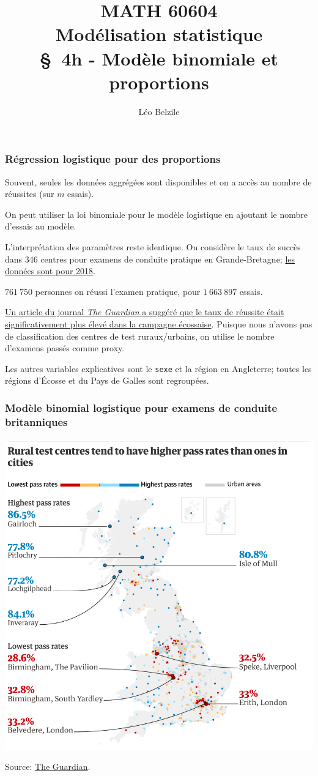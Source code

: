\documentclass{beamer}
\title[\color{white}{MATH 60604 \S~4h - Modèle binomiale et proportions}]{\texorpdfstring{MATH 60604 \\Modélisation statistique \\ \S~4h - Modèle binomiale et proportions}{MATH 60604 \\Modélisation statistique \\ \S~4h - Modèle binomiale et proportions}}
\author{Léo Belzile}
\institute{HEC Montréal\\
Département de sciences de la décision}
\date{}
\begin{document}
\frame{\titlepage}

\begin{frame}
 \frametitle{Régression logistique pour des proportions}
 
 \bi \item Souvent, seules les données aggrégées sont disponibles et on a accès au nombre de réussites (sur $m$ essais).
 \item On peut utiliser la loi binomiale pour le modèle logistique en ajoutant le nombre d'essais au modèle.
 \item L'interprétation des paramètres reste identique.
 \ei 
 On considère le taux de succès dans 346 centres pour examens de conduite pratique en Grande-Bretagne; \href{https://www.gov.uk/government/statistical-data-sets/driving-test-statistics-drt}{les données sont pour 2018}.

\bi 
\item $761\ 750$ personnes on réussi l'examen pratique, pour $1\ 663\ 897$ essais.
\item \href{https://www.theguardian.com/world/2019/aug/23/an-easy-ride-scottish-village-fuels-debate-driving-test-pass-rates}{Un article du journal \textit{The Guardian} a suggéré que le taux de réussite était significativement plus élevé dans la campagne écossaise}. Puisque nous n'avons pas de classification des centres de test ruraux/urbains, on utilise le nombre d'examens passés comme proxy.
\item Les autres variables explicatives sont le \texttt{sexe} et la région en Angleterre; toutes les régions d'Écosse et du Pays de Galles sont regroupées.
\ei
 \end{frame}
 \begin{frame}
 \frametitle{Modèle binomial logistique pour examens de conduite britanniques}
 \begin{center}
  \includegraphics[width = 0.6\linewidth]{img/c4/01-intro-Guardian_UK_driving2.png}
 \end{center}
 {\footnotesize 
Source: \href{https://www.theguardian.com/world/2019/aug/23/an-easy-ride-scottish-village-fuels-debate-driving-test-pass-rates}{The Guardian}.}
\end{frame}
\end{document}
